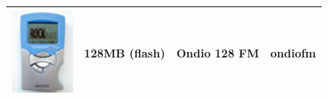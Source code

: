 \begin{center}
\begin{tabularx}{\textwidth}{llXl}
\begin{minipage}{2.2cm}
      \includegraphics[width=2cm]{getting_started/images/archos-ondiofm-small.png}
    \end{minipage}
                     & 128MB (flash) & Ondio 128 FM & ondiofm \\\bottomrule
  \end{tabularx}
\end{center}
